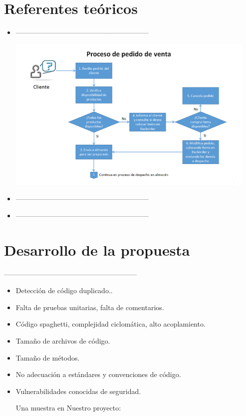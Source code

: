 \documentclass[preprint,12pt]{elsarticle}
\begin{document}
	\section{Referentes teóricos}
\begin{itemize} 
    \item ---------------------------------------------------------
	\begin{center}
	\includegraphics[width=12cm]{./imagen/1} 
	\end{center}
	\item ---------------------------------------------------------

	\item ---------------------------------------------------------

\end{itemize}

\section{Desarrollo de la propuesta}
---------------------------------------------------------
\begin{itemize}
	\item Detección de código duplicado..
	\item Falta de pruebas unitarias, falta de comentarios. 
	\item Código spaghetti, complejidad ciclomática, alto acoplamiento.
	\item Tamaño de archivos de código.
	\item Tamaño de métodos.
	\item No adecuación a estándares y convenciones de código.
	\item Vulnerabilidades conocidas de seguridad.
	
	Una muestra en Nuestro proyecto:
		
    
\end{itemize}
\end{document}
